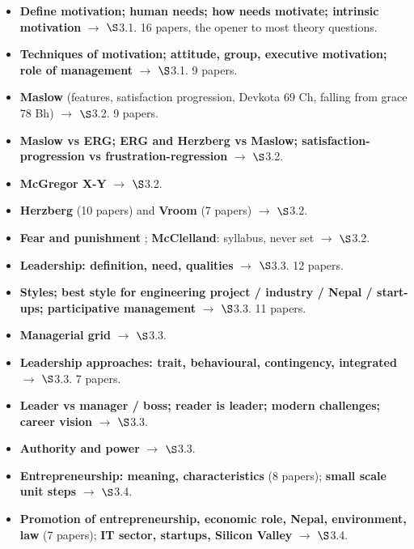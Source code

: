 \vspace{2pt}


\begin{itemize}
  \item \textbf{Define motivation; human needs; how needs motivate; intrinsic motivation}
    $\rightarrow$ $\S$3.1. 16 papers, the opener to most theory questions.
  \item \textbf{Techniques of motivation; attitude, group, executive motivation; role of
    management} $\rightarrow$ $\S$3.1. 9 papers.
  \item \textbf{Maslow} (features, satisfaction progression, Devkota 69 Ch, falling from
    grace 78 Bh) $\rightarrow$ $\S$3.2. 9 papers.
  \item \textbf{Maslow vs ERG; ERG and Herzberg vs Maslow; satisfaction-progression vs
    frustration-regression} $\rightarrow$ $\S$3.2. 
  \item \textbf{McGregor X-Y}  $\rightarrow$ $\S$3.2.
  \item \textbf{Herzberg} (10 papers) and \textbf{Vroom} (7 papers) $\rightarrow$ $\S$3.2.
  \item \textbf{Fear and punishment} ; \textbf{McClelland}: syllabus, never
    set $\rightarrow$ $\S$3.2.
  \item \textbf{Leadership: definition, need, qualities} $\rightarrow$ $\S$3.3. 12 papers.
  \item \textbf{Styles; best style for engineering project / industry / Nepal / start-ups;
    participative management} $\rightarrow$ $\S$3.3. 11 papers.
  \item \textbf{Managerial grid}  $\rightarrow$ $\S$3.3.
  \item \textbf{Leadership approaches: trait, behavioural, contingency, integrated}
    $\rightarrow$ $\S$3.3. 7 papers.
  \item \textbf{Leader vs manager / boss; reader is leader; modern challenges; career
    vision} $\rightarrow$ $\S$3.3. 
  \item \textbf{Authority and power}  $\rightarrow$ $\S$3.3.
  \item \textbf{Entrepreneurship: meaning, characteristics} (8 papers); \textbf{small scale
    unit steps}  $\rightarrow$ $\S$3.4.
  \item \textbf{Promotion of entrepreneurship, economic role, Nepal, environment, law}
    (7 papers); \textbf{IT sector, startups, Silicon Valley} 
    $\rightarrow$ $\S$3.4.
\end{itemize}

